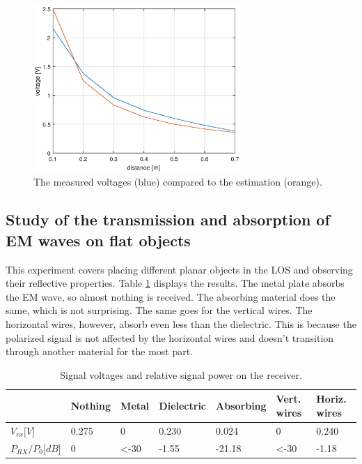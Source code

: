 \documentclass{article}
\begin{document}
		\begin{figure}[H]
			\centering
			\label{11fig}
			\includegraphics[width=0.7\textwidth]{Plotjes/ass11.eps}
			\caption{The measured voltages (blue) compared to the estimation (orange).}
		\end{figure}


	\subsection{Study of the transmission and absorption of EM waves on flat objects}
		This experiment covers placing different planar objects in the LOS and observing their reflective properties. 
		Table \ref{12vrx} displays the results.
		The metal plate absorbs the EM wave, so almost nothing is received.
		The absorbing material does the same, which is not surprising.
		The same goes for the vertical wires. 
		The horizontal wires, however, absorb even less than the dielectric.
		This is because the polarized signal is not affected by the horizontal wires and doesn't transition through another material for the most part.
		
		\begin{table}[H]
			\centering
			\begin{tabular}{l|llllll}

				                       & Nothing        & Metal         & Dielectric & Absorbing & Vert. wires & Horiz. wires \\ \hline
				$V_{rx} {[}V{]} $        & 0.275          & 0             & 0.230      & 0.024     & 0              & 0.240            \\
				$P_{RX}/P_{0} {[}dB{]}$  & 0              & \textless -30 & -1.55      & -21.18    & \textless -30  & -1.18  
			\end{tabular}
			\caption{Signal voltages and relative signal power on the receiver.}
			\label{12vrx}
		\end{table}
\end{document}
